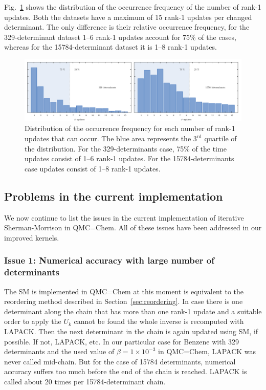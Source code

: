 \documentclass[11pt]{article}
\numberwithin{figure}{section}
\numberwithin{table}{section}
\begin{document}
    Fig.~\ref{fig:upd_freq} shows the distribution of the occurrence frequency of the number of rank-1 updates. Both the datasets have a maximum of 15 rank-1 updates per changed determinant. The only difference is their relative occurrence frequency, for the 329-determinant dataset 1--6 rank-1 updates account for 75\% of the cases, whereas for the 15784-determinant dataset it is 1--8 rank-1 updates. 
    
    \begin{figure}[h]
    	\centering
    	\includegraphics[width=1\textwidth]{upd_freq_hor.png}
    	\caption{Distribution of the occurrence frequency for each number of rank-1 updates that can occur. The blue area represents the $3^\mathrm{rd}$ quartile of the distribution. For the 329-determinants case, 75\% of the time updates consist of 1--6 rank-1 updates. For the 15784-determinants case updates consist of 1--8 rank-1 updates.}
    	\label{fig:upd_freq}
    \end{figure}
    
    \subsection{Problems in the current implementation}
      We now continue to list the issues in the current implementation of iterative Sherman-Morrison in QMC=Chem. All of these issues have been addressed in our improved kernels.
			
    \subsubsection{Issue 1: Numerical accuracy with large number of determinants}
      The SM is implemented in QMC=Chem at this moment is equivalent to the reordering method described in Section~\ref{sec:reordering}. In case there is one determinant along the chain that has more than one rank-1 update and a suitable order to apply the $U_k$ cannot be found the whole inverse is recomputed with LAPACK. Then the next determinant in the chain is again updated using SM, if possible. If not, LAPACK, etc. In our particular case for Benzene with 329 determinants and the used value of $\beta=1\times 10^{-3}$ in QMC=Chem, LAPACK was never called mid-chain. But for the case of 15784 determinants, numerical accuracy suffers too much before the end of the chain is reached. LAPACK is called about 20 times per 15784-determinant chain.\\    
    
\end{document}
